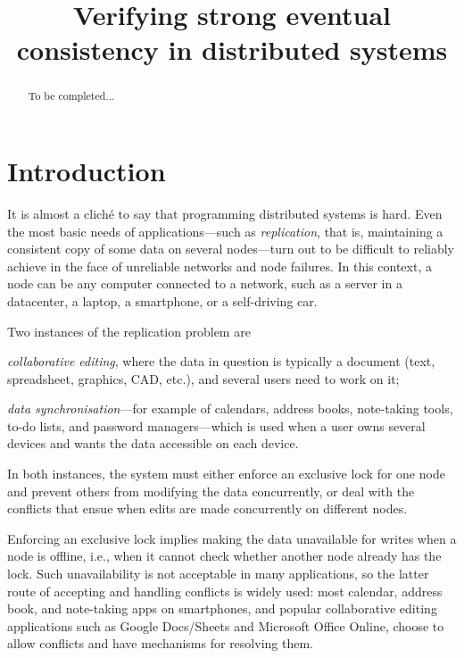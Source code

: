 \documentclass[acmlarge,review,anonymous]{acmart}\settopmatter{printfolios=true}
\begin{document}
\title{Verifying strong eventual consistency in distributed systems}

\maketitle

\begin{abstract}
To be completed...
\end{abstract}


\section{Introduction}
\label{sect.introduction}

It is almost a clich{\' e} to say that programming distributed systems is hard. Even the most basic
needs of applications---such as \emph{replication}, that is, maintaining a consistent copy of some
data on several nodes---turn out to be difficult to reliably achieve in the face of unreliable
networks and node failures. In this context, a node can be any computer connected to a network, such
as a server in a datacenter, a laptop, a smartphone, or a self-driving car.

Two instances of the replication problem are
\begin{inparaenum}
\item \emph{collaborative editing}, where the data in question is typically a document (text,
    spreadsheet, graphics, CAD, etc.), and several users need to work on it;
\item \emph{data synchronisation}---for example of calendars, address books, note-taking tools,
    to-do lists, and password managers---which is used when a user owns several devices and wants
    the data accessible on each device.
\end{inparaenum}
In both instances, the system must either enforce an exclusive lock for one node and prevent others
from modifying the data concurrently, or deal with the conflicts that ensue when edits are made
concurrently on different nodes.

Enforcing an exclusive lock implies making the data unavailable for writes when a node is offline,
i.e., when it cannot check whether another node already has the lock. Such unavailability is not
acceptable in many applications, so the latter route of accepting and handling conflicts is widely
used: most calendar, address book, and note-taking apps on smartphones, and popular collaborative
editing applications such as Google Docs/Sheets and Microsoft Office Online, choose to allow
conflicts and have mechanisms for resolving them.
\end{document}
